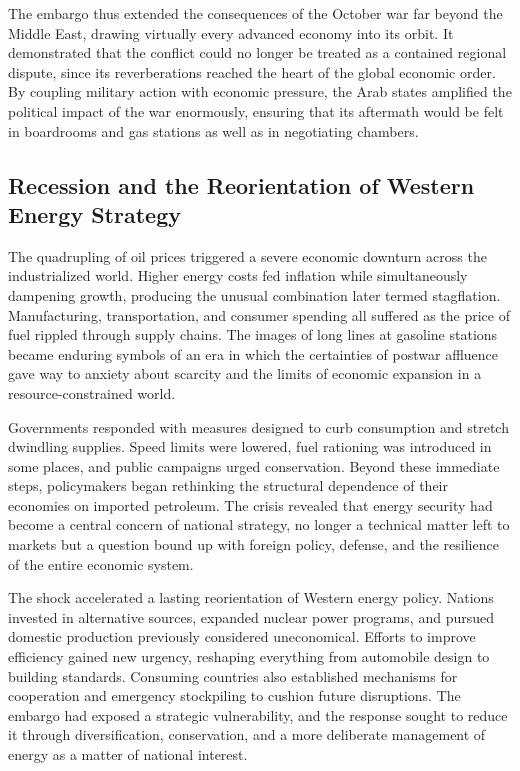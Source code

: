 The embargo thus extended the consequences of the October war far beyond the Middle East, drawing virtually every advanced economy into its orbit. It demonstrated that the conflict could no longer be treated as a contained regional dispute, since its reverberations reached the heart of the global economic order. By coupling military action with economic pressure, the Arab states amplified the political impact of the war enormously, ensuring that its aftermath would be felt in boardrooms and gas stations as well as in negotiating chambers. \cite{siniver2013} \cite{bregman2002} \cite{rabinovich2004}

\subsection{Recession and the Reorientation of Western Energy Strategy}
The quadrupling of oil prices triggered a severe economic downturn across the industrialized world. Higher energy costs fed inflation while simultaneously dampening growth, producing the unusual combination later termed stagflation. Manufacturing, transportation, and consumer spending all suffered as the price of fuel rippled through supply chains. The images of long lines at gasoline stations became enduring symbols of an era in which the certainties of postwar affluence gave way to anxiety about scarcity and the limits of economic expansion in a resource-constrained world.

Governments responded with measures designed to curb consumption and stretch dwindling supplies. Speed limits were lowered, fuel rationing was introduced in some places, and public campaigns urged conservation. Beyond these immediate steps, policymakers began rethinking the structural dependence of their economies on imported petroleum. The crisis revealed that energy security had become a central concern of national strategy, no longer a technical matter left to markets but a question bound up with foreign policy, defense, and the resilience of the entire economic system.

The shock accelerated a lasting reorientation of Western energy policy. Nations invested in alternative sources, expanded nuclear power programs, and pursued domestic production previously considered uneconomical. Efforts to improve efficiency gained new urgency, reshaping everything from automobile design to building standards. Consuming countries also established mechanisms for cooperation and emergency stockpiling to cushion future disruptions. The embargo had exposed a strategic vulnerability, and the response sought to reduce it through diversification, conservation, and a more deliberate management of energy as a matter of national interest.

